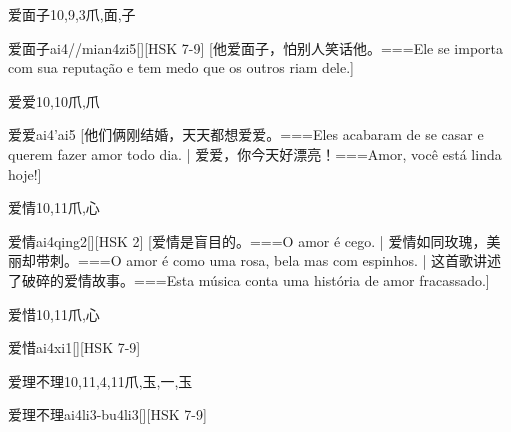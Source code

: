 \begin{Entry}{爱面子}{10,9,3}{⽖,⾯,⼦}
  \begin{Phonetics}{爱面子}{ai4//mian4zi5}[][HSK 7-9]
    [他爱面子，怕别人笑话他。===Ele se importa com sua reputação e tem medo que os outros riam dele.]
  \end{Phonetics}
\end{Entry}

\begin{Entry}{爱爱}{10,10}{⽖,⽖}
  \begin{Phonetics}{爱爱}{ai4'ai5}
    [他们俩刚结婚，天天都想爱爱。===Eles acabaram de se casar e querem fazer amor todo dia. | 爱爱，你今天好漂亮！===Amor, você está linda hoje!]
  \end{Phonetics}
\end{Entry}

\begin{Entry}{爱情}{10,11}{⽖,⼼}
  \begin{Phonetics}{爱情}{ai4qing2}[][HSK 2]
    [爱情是盲目的。===O amor é cego. | 爱情如同玫瑰，美丽却带刺。===O amor é como uma rosa, bela mas com espinhos.  | 这首歌讲述了破碎的爱情故事。===Esta música conta uma história de amor fracassado.]
  \end{Phonetics}
\end{Entry}

\begin{Entry}{爱惜}{10,11}{⽖,⼼}
  \begin{Phonetics}{爱惜}{ai4xi1}[][HSK 7-9]
  \end{Phonetics}
\end{Entry}

\begin{Entry}{爱理不理}{10,11,4,11}{⽖,⽟,⼀,⽟}
  \begin{Phonetics}{爱理不理}{ai4li3-bu4li3}[][HSK 7-9]
  \end{Phonetics}
\end{Entry}

